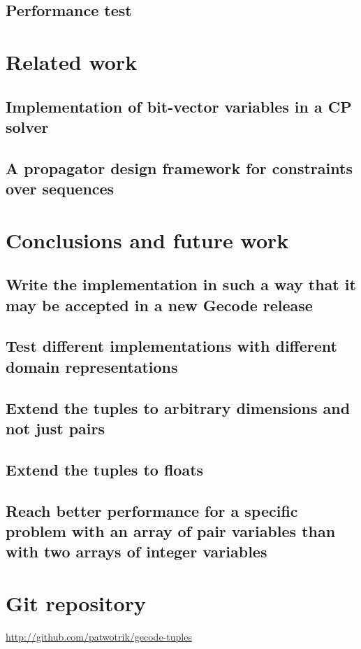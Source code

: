 \documentclass[a4paper,11pt]{article}
\begin{document}
\subsection{Performance test}

\section{Related work}
\subsection{Implementation of bit-vector variables in a CP solver}
\subsection{A propagator design framework for constraints over sequences}

\section{Conclusions and future work}

\subsection{Write the implementation in such a way that it may be accepted in a new Gecode release}
\subsection{Test different implementations with different domain representations}
\subsection{Extend the tuples to arbitrary dimensions and not just pairs}
\subsection{Extend the tuples to floats}
\subsection{Reach better performance for a specific problem with an array of pair variables than with two arrays of integer variables}

\section{Git repository}
\url{http://github.com/patwotrik/gecode-tuples}
\end{document}

